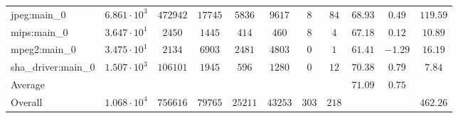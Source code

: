 \begin{tabular}{|l|c|c|c|c|c|c|c|c|c|c|}
jpeg:main\_0            & $ 6.861 \cdot 10^{3} $ & $ 472942 $ & $ 17745 $ & $ 5836  $ & $ 9617  $ & $ 8   $ & $ 84  $ & $ 68.93       $ & $ 0.49    $ & $ 119.59  $ \\
mips:main\_0            & $ 3.647 \cdot 10^{1} $ & $ 2450   $ & $ 1445  $ & $ 414   $ & $ 460   $ & $ 8   $ & $ 4   $ & $ 67.18       $ & $ 0.12    $ & $ 10.89   $ \\
mpeg2:main\_0           & $ 3.475 \cdot 10^{1} $ & $ 2134   $ & $ 6903  $ & $ 2481  $ & $ 4803  $ & $ 0   $ & $ 1   $ & $ 61.41       $ & $ -1.29   $ & $ 16.19   $ \\
sha\_driver:main\_0     & $ 1.507 \cdot 10^{3} $ & $ 106101 $ & $ 1945  $ & $ 596   $ & $ 1280  $ & $ 0   $ & $ 12  $ & $ 70.38       $ & $ 0.79    $ & $ 7.84    $ \\
\hline
Average                 & $                    $ & $        $ & $       $ & $       $ & $       $ & $     $ & $     $ & $ 71.09       $ & $ 0.75    $ & $         $ \\
\hline
Overall                 & $ 1.068 \cdot 10^{4} $ & $ 756616 $ & $ 79765 $ & $ 25211 $ & $ 43253 $ & $ 303 $ & $ 218 $ & $             $ & $         $ & $ 462.26  $ \\
\hline
\end{tabular}
